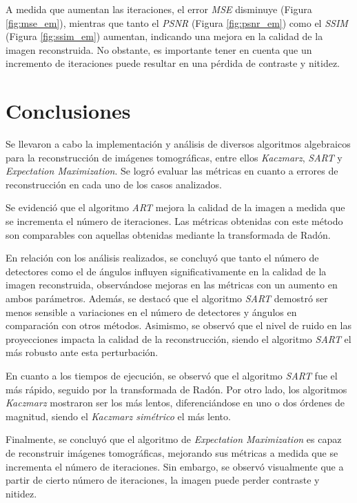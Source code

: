 \documentclass[11pt, twocolumn]{article}
\begin{document}
A medida que aumentan las iteraciones, el error \textit{MSE} disminuye (Figura \ref{fig:mse_em}), mientras que tanto el \textit{PSNR} (Figura \ref{fig:psnr_em}) como el \textit{SSIM} (Figura \ref{fig:ssim_em}) aumentan, indicando una mejora en la calidad de la imagen reconstruida. No obstante, es importante tener en cuenta que un incremento de iteraciones puede resultar en una pérdida de contraste y nitidez.

\section{Conclusiones}
Se llevaron a cabo la implementación y análisis de diversos algoritmos algebraicos para la reconstrucción de imágenes tomográficas, entre ellos \textit{Kaczmarz}, \textit{SART} y \textit{Expectation Maximization}. Se logró evaluar las métricas en cuanto a errores de reconstrucción en cada uno de los casos analizados.

Se evidenció que el algoritmo \textit{ART} mejora la calidad de la imagen a medida que se incrementa el número de iteraciones. Las métricas obtenidas con este método son comparables con aquellas obtenidas mediante la transformada de Radón.

En relación con los análisis realizados, se concluyó que tanto el número de detectores como el de ángulos influyen significativamente en la calidad de la imagen reconstruida, observándose mejoras en las métricas con un aumento en ambos parámetros. Además, se destacó que el algoritmo \textit{SART} demostró ser menos sensible a variaciones en el número de detectores y ángulos en comparación con otros métodos. Asimismo, se observó que el nivel de ruido en las proyecciones impacta la calidad de la reconstrucción, siendo el algoritmo \textit{SART} el más robusto ante esta perturbación.

En cuanto a los tiempos de ejecución, se observó que el algoritmo \textit{SART} fue el más rápido, seguido por la transformada de Radón. Por otro lado, los algoritmos \textit{Kaczmarz} mostraron ser los más lentos, diferenciándose en uno o dos órdenes de magnitud, siendo el \textit{Kaczmarz simétrico} el más lento.

Finalmente, se concluyó que el algoritmo de \textit{Expectation Maximization} es capaz de reconstruir imágenes tomográficas, mejorando sus métricas a medida que se incrementa el número de iteraciones. Sin embargo, se observó visualmente que a partir de cierto número de iteraciones, la imagen puede perder contraste y nitidez.
\end{document}
